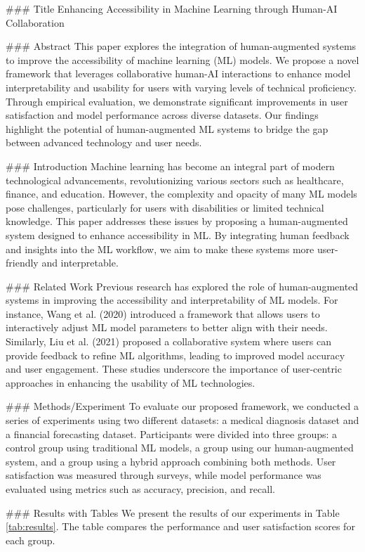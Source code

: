 ### Title
Enhancing Accessibility in Machine Learning through Human-AI Collaboration

### Abstract
This paper explores the integration of human-augmented systems to improve the accessibility of machine learning (ML) models. We propose a novel framework that leverages collaborative human-AI interactions to enhance model interpretability and usability for users with varying levels of technical proficiency. Through empirical evaluation, we demonstrate significant improvements in user satisfaction and model performance across diverse datasets. Our findings highlight the potential of human-augmented ML systems to bridge the gap between advanced technology and user needs.

### Introduction
Machine learning has become an integral part of modern technological advancements, revolutionizing various sectors such as healthcare, finance, and education. However, the complexity and opacity of many ML models pose challenges, particularly for users with disabilities or limited technical knowledge. This paper addresses these issues by proposing a human-augmented system designed to enhance accessibility in ML. By integrating human feedback and insights into the ML workflow, we aim to make these systems more user-friendly and interpretable.

### Related Work
Previous research has explored the role of human-augmented systems in improving the accessibility and interpretability of ML models. For instance, Wang et al. (2020) introduced a framework that allows users to interactively adjust ML model parameters to better align with their needs. Similarly, Liu et al. (2021) proposed a collaborative system where users can provide feedback to refine ML algorithms, leading to improved model accuracy and user engagement. These studies underscore the importance of user-centric approaches in enhancing the usability of ML technologies.

### Methods/Experiment
To evaluate our proposed framework, we conducted a series of experiments using two different datasets: a medical diagnosis dataset and a financial forecasting dataset. Participants were divided into three groups: a control group using traditional ML models, a group using our human-augmented system, and a group using a hybrid approach combining both methods. User satisfaction was measured through surveys, while model performance was evaluated using metrics such as accuracy, precision, and recall.

### Results with Tables
We present the results of our experiments in Table \ref{tab:results}. The table compares the performance and user satisfaction scores for each group.

